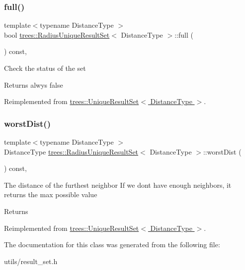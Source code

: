 \subsubsection{\texorpdfstring{full()}{full()}}
{\footnotesize\ttfamily template$<$typename Distance\+Type $>$ \\
bool \hyperlink{classtrees_1_1_radius_unique_result_set}{trees\+::\+Radius\+Unique\+Result\+Set}$<$ Distance\+Type $>$\+::full (\begin{DoxyParamCaption}{ }\end{DoxyParamCaption}) const\hspace{0.3cm}{\ttfamily [inline]}, {\ttfamily [virtual]}}

Check the status of the set \begin{DoxyReturn}{Returns}
alwys false 
\end{DoxyReturn}


Reimplemented from \hyperlink{classtrees_1_1_unique_result_set_a6c10f8635c22eaecaa7e6fda3afea132}{trees\+::\+Unique\+Result\+Set$<$ Distance\+Type $>$}.

\mbox{\label{classtrees_1_1_radius_unique_result_set_af0f7ec26a6515cb085df64a43afe433c}} 
\subsubsection{\texorpdfstring{worst\+Dist()}{worstDist()}}
{\footnotesize\ttfamily template$<$typename Distance\+Type $>$ \\
Distance\+Type \hyperlink{classtrees_1_1_radius_unique_result_set}{trees\+::\+Radius\+Unique\+Result\+Set}$<$ Distance\+Type $>$\+::worst\+Dist (\begin{DoxyParamCaption}{ }\end{DoxyParamCaption}) const\hspace{0.3cm}{\ttfamily [inline]}, {\ttfamily [virtual]}}

The distance of the furthest neighbor If we don\textquotesingle{}t have enough neighbors, it returns the max possible value \begin{DoxyReturn}{Returns}

\end{DoxyReturn}


Reimplemented from \hyperlink{classtrees_1_1_unique_result_set_a2301eba6dae87959cc50668dd2307d4d}{trees\+::\+Unique\+Result\+Set$<$ Distance\+Type $>$}.



The documentation for this class was generated from the following file\+:\begin{DoxyCompactItemize}
\item 
utils/result\+\_\+set.\+h\end{DoxyCompactItemize}
